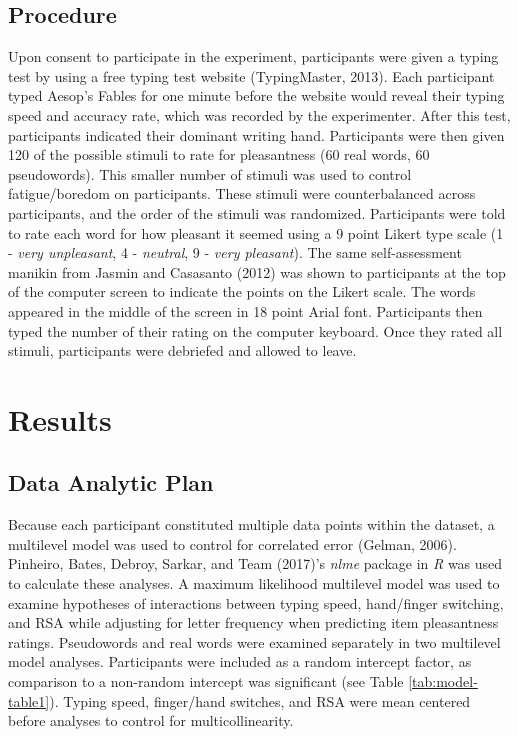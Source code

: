 \documentclass[english,man]{apa6}
\theoremstyle{definition}
\theoremstyle{definition}
\theoremstyle{definition}
\theoremstyle{remark}
\begin{document}
\subsection{Procedure}\label{procedure}

Upon consent to participate in the experiment, participants were given a
typing test by using a free typing test website (TypingMaster, 2013).
Each participant typed Aesop's Fables for one minute before the website
would reveal their typing speed and accuracy rate, which was recorded by
the experimenter. After this test, participants indicated their dominant
writing hand. Participants were then given 120 of the possible stimuli
to rate for pleasantness (60 real words, 60 pseudowords). This smaller
number of stimuli was used to control fatigue/boredom on participants.
These stimuli were counterbalanced across participants, and the order of
the stimuli was randomized. Participants were told to rate each word for
how pleasant it seemed using a 9 point Likert type scale (1 - \emph{very
unpleasant}, 4 - \emph{neutral}, 9 - \emph{very pleasant}). The same
self-assessment manikin from Jasmin and Casasanto (2012) was shown to
participants at the top of the computer screen to indicate the points on
the Likert scale. The words appeared in the middle of the screen in 18
point Arial font. Participants then typed the number of their rating on
the computer keyboard. Once they rated all stimuli, participants were
debriefed and allowed to leave.

\section{Results}\label{results}

\subsection{Data Analytic Plan}\label{data-analytic-plan}

Because each participant constituted multiple data points within the
dataset, a multilevel model was used to control for correlated error
(Gelman, 2006). Pinheiro, Bates, Debroy, Sarkar, and Team (2017)'s
\emph{nlme} package in \emph{R} was used to calculate these analyses. A
maximum likelihood multilevel model was used to examine hypotheses of
interactions between typing speed, hand/finger switching, and RSA while
adjusting for letter frequency when predicting item pleasantness
ratings. Pseudowords and real words were examined separately in two
multilevel model analyses. Participants were included as a random
intercept factor, as comparison to a non-random intercept was
significant (see Table \ref{tab:model-table1}). Typing speed,
finger/hand switches, and RSA were mean centered before analyses to
control for multicollinearity.
\end{document}
